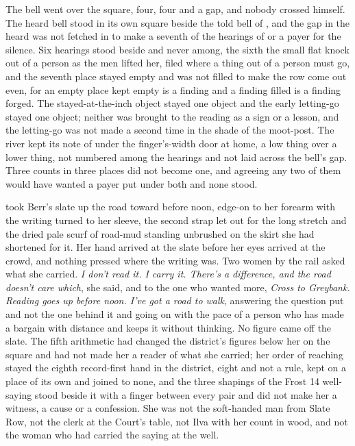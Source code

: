 The bell went over the square, four, four and a gap, and nobody crossed himself. The heard bell stood in its own square beside the told bell of , and the gap in the heard was not fetched in to make a seventh of the hearings of  or a payer for the silence. Six hearings stood beside and never among, the sixth the small flat knock out of a person as the men lifted her, filed where a thing out of a person must go, and the seventh place stayed empty and was not filled to make the row come out even, for an empty place kept empty is a finding and a finding filled is a finding forged. The stayed-at-the-inch object stayed one object and the early letting-go stayed one object; neither was brought to the reading as a sign or a lesson, and the letting-go was not made a second time in the shade of the moot-post. The river kept its note of  under the finger's-width door at home, a low thing over a lower thing, not numbered among the hearings and not laid across the bell's gap. Three counts in three places did not become one, and agreeing any two of them would have wanted a payer put under both and none stood.

\scenebreak

 took Berr's slate up the road toward  before noon, edge-on to her forearm with the writing turned to her sleeve, the second strap let out for the long stretch and the dried pale scurf of road-mud standing unbrushed on the skirt she had shortened for it. Her hand arrived at the slate before her eyes arrived at the crowd, and nothing pressed where the writing was. Two women by the rail asked what she carried. \emph{I don't read it. I carry it. There's a difference, and the road doesn't care which}, she said, and to the one who wanted more, \emph{Cross to Greybank. Reading goes up before noon. I've got a road to walk}, answering the question put and not the one behind it and going on with the pace of a person who has made a bargain with distance and keeps it without thinking. No figure came off the slate. The fifth arithmetic had changed the district's figures below her on the square and had not made her a reader of what she carried; her order of reaching stayed the eighth record-first hand in the district, eight and not a rule, kept on a place of its own and joined to none, and the three shapings of the Frost 14 well-saying stood beside it with a finger between every pair and did not make her a witness, a cause or a confession. She was not the soft-handed man from Slate Row, not the clerk at the Court's table, not Ilva with her count in wood, and not the woman who had carried the saying at the well.

